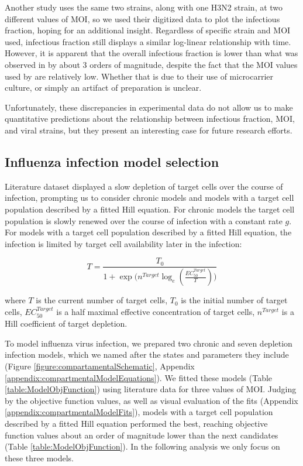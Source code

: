 Another study \cite{schulze2009infection} uses the same two strains, along with one H3N2 strain, at two different values of MOI, so we used their digitized data to plot the infectious fraction, hoping for an additional insight. Regardless of specific strain and MOI used, infectious fraction still displays a similar log-linear relationship with time. However, it is apparent that the overall infectious fraction is lower than what was observed in \cite{rudiger2019multiscale, frensing2016influenza} by about 3 orders of magnitude, despite the fact that the MOI values used by \cite{schulze2009infection} are relatively low. Whether that is due to their use of microcarrier culture, or simply an artifact of preparation is unclear.

Unfortunately, these discrepancies in experimental data do not allow us to make quantitative predictions about the relationship between infectious fraction, MOI, and viral strains, but they present an interesting case for future research efforts.

\subsection{Influenza infection model selection}

Literature dataset \cite{rudiger2019multiscale} displayed a slow depletion of target cells over the course of infection, prompting us to consider chronic models and models with a target cell population described by a fitted Hill equation. For chronic models the target cell population is slowly renewed over the course of infection with a constant rate $g$. For models with a target cell population described by a fitted Hill equation, the infection is limited by target cell availability later in the infection:

\begin{equation}
T = \frac{T_0}{1+\exp \big(n^{Target}\log_e(\frac{EC_{50}^{Target}}{T})\big)}
\end{equation}

where $T$ is the current number of target cells, $T_0$ is the initial number of target cells, $EC_{50}^{Target}$ is a half maximal effective concentration of target cells, $n^{Target}$ is a Hill coefficient of target depletion.

To model influenza virus infection, we prepared two chronic and seven depletion infection models, which we named after the states and parameters they include (Figure \ref{figure:compartamentalSchematic}, Appendix \ref{appendix:compartmentalModelEquations}). We fitted these models (Table \ref{table:ModelObjFunction}) using literature data \cite{rudiger2019multiscale, frensing2016influenza} for three values of MOI. Judging by the objective function values, as well as visual evaluation of the fits (Appendix \ref{appendix:compartmentalModelFits}), models with a target cell population described by a fitted Hill equation performed the best, reaching objective function values about an order of magnitude lower than the next candidates (Table \ref{table:ModelObjFunction}). In the following analysis we only focus on these three models.


